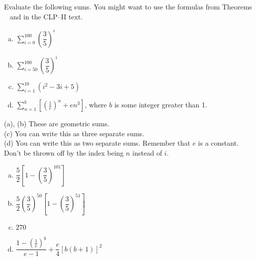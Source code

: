 \begin{question}
Evaluate the following sums. You might want to use the formulas from Theorems ~ and 
in the CLP--II text.
\begin{enumerate}[(a)]
\item $\displaystyle\sum_{i=0}^{100} \left(\dfrac{3}{5}\right)^i$
\item $\displaystyle\sum_{i=50}^{100} \left(\dfrac{3}{5}\right)^i$
\item $\displaystyle\sum_{i=1}^{10} \left(i^2-3i+5\right)$
\item $\displaystyle\sum_{n=1}^{b}\left[ \left(\frac{1}{e}\right)^n+en^3\right]$, where $b$ is some integer greater than 1.
\end{enumerate}
\end{question}
\begin{hint}
(a), (b) These are geometric sums.\\
(c) You can write this as three separate sums.\\
(d) You can write this as two separate sums. Remember that $e$ is a constant.  Don't be thrown off by the index being $n$ instead of $i$.
\end{hint}
\begin{answer}
\begin{enumerate}[(a)]
\item $\dfrac{5}{2}\left[1-\left(\dfrac{3}{5}\right)^{101}\right]$
\item $\dfrac{5}{2}\left(\dfrac{3}{5}\right)^{50}\left[1-\left(\dfrac{3}{5}\right)^{51}\right]$
\item $270$
\item $\dfrac{1-\left(\frac{1}{e}\right)^b}{e-1}+\dfrac{e}{4}\left[b(b+1)\right]^2$
\end{enumerate}
\end{answer}
